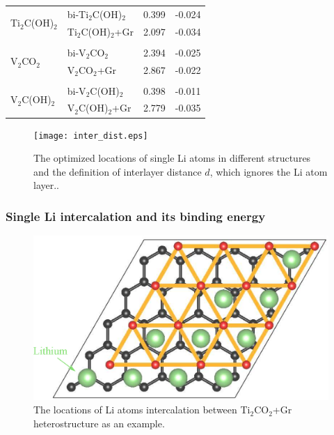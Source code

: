 \begin{table}[htb]
\begin{tabularx}{\linewidth}{XXXX}
\multirow{2}{*}{Ti$_2$C(OH)$_2$} & bi-Ti$_2$C(OH)$_2$                                               & 0.399                   & -0.024                         \\
              & Ti$_2$C(OH)$_2$+Gr                                                  & 2.097                    & -0.034                         \\
\multicolumn{4}{c}{}\\             
\multirow{2}{*}{V$_2$CO$_2$}     & bi-V$_2$CO$_2$                                                 & 2.394                    & -0.025                         \\
              & V$_2$CO$_2$+Gr                                                     & 2.867                    & -0.022                         \\
\multicolumn{4}{c}{}\\              
\multirow{2}{*}{V$_2$C(OH)$_2$}  & bi-V$_2$C(OH)$_2$                                              & 0.398                    & -0.011                         \\
              & V$_2$C(OH)$_2$+Gr                                                 & 2.779                    & -0.035                         \\ \hline                     
\end{tabularx}
\end{table}

\begin{figure}[htb]
\centering
\texttt{[image: inter\_dist.eps]}%
\caption{The optimized locations of single Li atoms in different structures and the definition of interlayer distance $d$, which ignores the Li atom layer.\label{inter-dist}.}
\end{figure}

\subsubsection{Single Li intercalation and its binding energy}

\begin{figure}[htb]
\centering
\includegraphics[width=0.8\linewidth]{sites.eps}%
\caption{The locations of Li atoms intercalation between Ti$_2$CO$_2$+Gr heterostructure as an example.  \label{sites}}
\end{figure}

